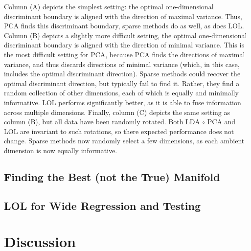 \documentclass[10pt]{article}
\renewcommand{\familydefault}{\sfdefault}
\begin{document}


Column (A) depicts the simplest setting: the optimal one-dimensional discriminant boundary is aligned with the direction of maximal variance.  Thus, PCA finds this discriminant boundary,  sparse methods do as well, as does LOL. Column (B) depicts a slightly more difficult setting, the optimal one-dimensional discriminant boundary is aligned with the direction of minimal variance.   This is the most difficult setting for PCA, because PCA finds the directions of maximal variance, and thus discards directions of minimal variance (which, in this case, includes the optimal discriminant direction).  Sparse methods could recover the optimal discriminant direction, but typically fail to find it.  Rather, they find a random collection of other dimensions, each of which is equally and minimally informative.  LOL performs significantly better, as it is able to fuse information across multiple dimensions.  Finally, column (C) depicts the same setting as column (B), but all data have been randomly rotated.  Both LDA $\circ$ PCA and LOL are invariant to such rotations, so there expected performance does not change.  Sparse methods now randomly select a few dimensions, as each ambient dimension is now equally informative.  


\subsection*{Finding the Best (not the True) Manifold}


\subsection*{LOL for Wide Regression and Testing}


\section*{Discussion}




\end{document}
